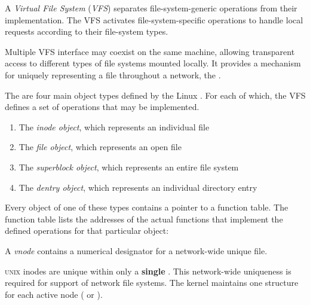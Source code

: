 \begin{definition}\label{def:Virtual_File_System}
  A \emph{Virtual File System} (\emph{VFS}) separates file-system-generic operations from their implementation.
  The VFS activates file-system-specific operations to handle local requests according to their file-system types.

  Multiple VFS interface may coexist on the same machine, allowing transparent access to different types of file systems mounted locally.
  It provides a mechanism for uniquely representing a file throughout a network, the .
\end{definition}

The are four main object types defined by the Linux .
For each of which, the VFS defines a set of operations that may be implemented.
\begin{enumerate}[noitemsep]
\item The \emph{inode object}, which represents an individual file
\item The \emph{file object}, which represents an open file
\item The \emph{superblock object}, which represents an entire file system
\item The \emph{dentry object}, which represents an individual directory entry
\end{enumerate}

Every object of one of these types contains a pointer to a function table.
The function table lists the addresses of the actual functions that implement the defined operations for that particular object:

\begin{definition}[vnode]\label{def:Vnode}
  A \emph{vnode} contains a numerical designator for a network-wide unique file.

  \begin{remark}\label{rmk:Vnode_vs_Inode}
    \textsc{unix} inodes are unique within only a \textbf{single} .
    This network-wide uniqueness is required for support of network file systems.
    The kernel maintains one  structure for each active node ( or ).
  \end{remark}
\end{definition}

